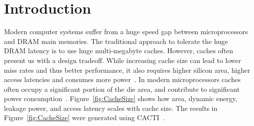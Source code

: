 
\chapter{Introduction}
\label{ch:Introduction}

Modern computer systems suffer from a huge speed gap between microprocessors and DRAM main memories. The traditional approach to tolerate the huge DRAM latency is to use huge multi-megabyte caches. However, caches often present us with a design tradeoff. While increasing cache size can lead to lower miss rates and thus better performance, it also requires higher silicon area, higher access latencies and consumes more power~\cite{skadron1999branch}. In modern microprocessors caches often occupy a significant portion of the die area, and contribute to significant power consumption~\cite{skylake,power9}. Figure~\ref{fig:CacheSize} shows how area, dynamic energy, leakage power, and access latency scales with cache size. The results in Figure~\ref{fig:CacheSize} were generated using CACTI~\cite{cacti}.\par

